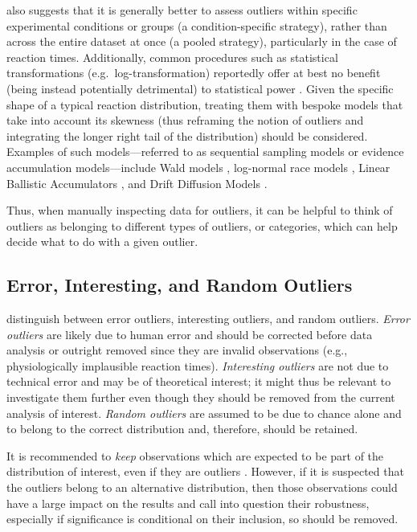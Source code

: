 \documentclass[sn-basic, lineno,pdflatex]{sn-jnl}
\begin{document}
\citet{miller2023outlier} also suggests that it is generally better to
assess outliers within specific experimental conditions or groups (a
condition-specific strategy), rather than across the entire dataset at
once (a pooled strategy), particularly in the case of reaction times.
Additionally, common procedures such as statistical transformations
(e.g.~log-transformation) reportedly offer at best no benefit (being
instead potentially detrimental) to statistical power
\citep{schramm2019reaction}. Given the specific shape of a typical
reaction distribution, treating them with bespoke models that take into
account its skewness (thus reframing the notion of outliers and
integrating the longer right tail of the distribution) should be
considered. Examples of such models---referred to as sequential sampling
models or evidence accumulation models---include Wald models
\citep{anders2016shifted}, log-normal race models
\citep{rouder2015lognormal}, Linear Ballistic Accumulators
\citep{brown2008simplest}, and Drift Diffusion Models
\citep{ratcliff2016diffusion}.

Thus, when manually inspecting data for outliers, it can be helpful to
think of outliers as belonging to different types of outliers, or
categories, which can help decide what to do with a given outlier.

\hypertarget{error-interesting-and-random-outliers}{%
\subsection{Error, Interesting, and Random
Outliers}\label{error-interesting-and-random-outliers}}

\citet{leys2019outliers} distinguish between error outliers, interesting
outliers, and random outliers. \emph{Error outliers} are likely due to
human error and should be corrected before data analysis or outright
removed since they are invalid observations (e.g., physiologically
implausible reaction times). \emph{Interesting outliers} are not due to
technical error and may be of theoretical interest; it might thus be
relevant to investigate them further even though they should be removed
from the current analysis of interest. \emph{Random outliers} are
assumed to be due to chance alone and to belong to the correct
distribution and, therefore, should be retained.

It is recommended to \emph{keep} observations which are expected to be
part of the distribution of interest, even if they are outliers
\citep{leys2019outliers}. However, if it is suspected that the outliers
belong to an alternative distribution, then those observations could
have a large impact on the results and call into question their
robustness, especially if significance is conditional on their
inclusion, so should be removed.
\end{document}
